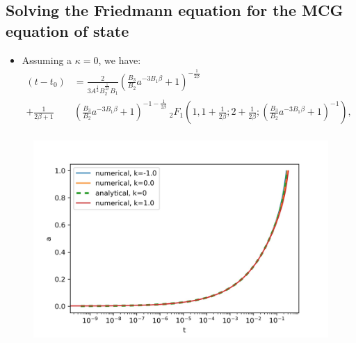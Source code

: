 \documentclass{beamer}
\newcommand{\brac}[1]{\left(#1\right)}
\begin{document}
\subsection{Solving the Friedmann equation for the MCG equation of state}
\begin{frame}
\begin{itemize}
\frametitle{\insertsectionhead}
\framesubtitle{\insertsubsectionhead}
\fontsize{7pt}{7.2}\selectfont
\item Assuming a $\kappa=0$, we have:
\fontsize{6pt}{7.2}\selectfont
\begin{equation}\label{eq:FmEqMCGSol}
\begin{split}
\brac{t-t_{0}}&=\frac{2}{3A^{\frac{1}{2}}B_{2}^{\frac{1}{2\beta}}B_{1}}\brac{\frac{B_{3}}{B_{2}}a^{-3B_{1}\beta}+1}^{-\frac{1}{2\beta}}\\
+\frac{1}{2\beta+1}&\brac{\frac{B_{3}}{B_{2}}a^{-3B_{1}\beta}+1}^{-1-\frac{1}{2\beta}}\ _{2}F_{1}\brac{1,1+\frac{1}{2\beta};2+\frac{1}{2\beta};\brac{\frac{B_{3}}{B_{2}}a^{-3B_{1}\beta}+1}^{-1}},\\
\end{split}
\end{equation}
\end{itemize}
\begin{figure}[H]
\centering
\includegraphics[scale=0.45]{Images/a_ch.jpg}
\label{fig:ChScale}
\end{figure}
\end{frame}
\end{document}
